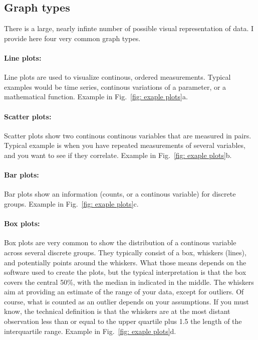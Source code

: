 \documentclass[a4paper,twoside]{tufte-book}\usepackage[]{graphicx}\usepackage[]{color}
\begin{document}
\subsection{Graph types}

There is a large, nearly infinte number of possible visual representation of data. I provide here four very common graph types. 

\paragraph{Line plots:} Line plots are used to visualize continous, ordered measurements. Typical examples would be time series, continous variations of a parameter, or a mathematical function. Example in Fig.~\ref{fig: exaple plots}a.

\paragraph{Scatter plots:} Scatter plots show two continous continous variables that are measured in pairs. Typical example is when you have repeated measurements of several variables, and you want to see if they correlate. Example in Fig.~\ref{fig: exaple plots}b.

\paragraph{Bar plots:} Bar plots show an information (counts, or a continous variable) for discrete groups. Example in Fig.~\ref{fig: exaple plots}c.

\paragraph{Box plots:} Box plots are very common to show the distribution of a continous variable across several discrete groups. They typically consist of a box, whiskers (lines), and potentially points around the whiskers. What those means depends on the software used to create the plots, but the typical interpretation is that the box covers the central 50\%, with the median in indicated in the middle. The whiskers aim at providing an estimate of the range of your data, except for outliers. Of course, what is counted as an outlier depends on your assumptions. If you must know, the technical definition is that the whiskers are at the most distant observation less than or equal to the upper quartile plus 1.5 the length of the interquartile range. Example in Fig.~\ref{fig: exaple plots}d.
\end{document}
